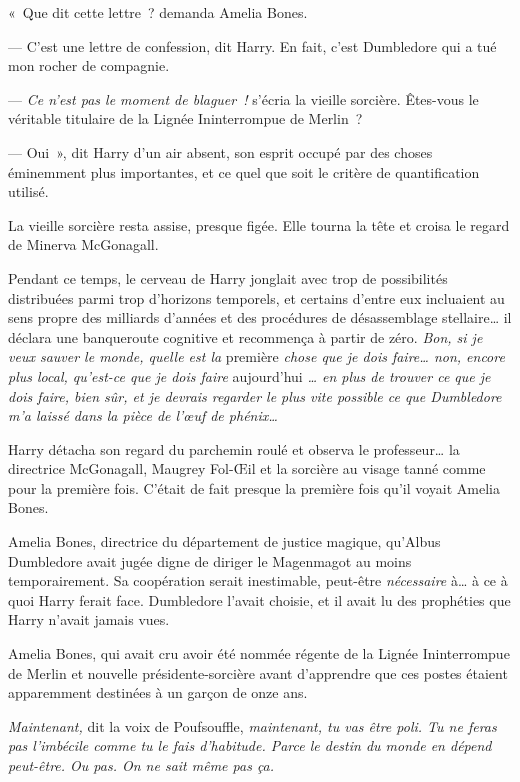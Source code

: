 «~Que dit cette lettre~? demanda Amelia Bones.

--- C'est une lettre de confession, dit Harry. En fait, c'est Dumbledore qui a tué mon rocher de compagnie.

--- \emph{Ce n'est pas le moment de blaguer~!} s'écria la vieille sorcière. Êtes-vous le véritable titulaire de la Lignée Ininterrompue de Merlin~?

--- Oui~», dit Harry d'un air absent, son esprit occupé par des choses éminemment plus importantes, et ce quel que soit le critère de quantification utilisé.

La vieille sorcière resta assise, presque figée. Elle tourna la tête et croisa le regard de Minerva McGonagall.

Pendant ce temps, le cerveau de Harry jonglait avec trop de possibilités distribuées parmi trop d'horizons temporels, et certains d'entre eux incluaient au sens propre des milliards d'années et des procédures de désassemblage stellaire… il déclara une banqueroute cognitive et recommença à partir de zéro. \emph{Bon, si je veux sauver le monde, quelle est la} première \emph{chose que je dois faire… non, encore plus local, qu'est-ce que je dois faire} aujourd'hui \emph{… en plus de trouver ce que je dois faire, bien sûr, et je devrais regarder le plus vite possible ce que Dumbledore m'a laissé dans la pièce de l'œuf de phénix…}

Harry détacha son regard du parchemin roulé et observa le professeur… la directrice McGonagall, Maugrey Fol-Œil et la sorcière au visage tanné comme pour la première fois. C'était de fait presque la première fois qu'il voyait Amelia Bones.

Amelia Bones, directrice du département de justice magique, qu'Albus Dumbledore avait jugée digne de diriger le Magenmagot au moins temporairement. Sa coopération serait inestimable, peut-être \emph{nécessaire} à… à ce à quoi Harry ferait face. Dumbledore l'avait choisie, et il avait lu des prophéties que Harry n'avait jamais vues.

Amelia Bones, qui avait cru avoir été nommée régente de la Lignée Ininterrompue de Merlin et nouvelle présidente-sorcière avant d'apprendre que ces postes étaient apparemment destinées à un garçon de onze ans.

\emph{Maintenant,} dit la voix de Poufsouffle, \emph{maintenant, tu vas être poli. Tu ne feras pas l'imbécile comme tu le fais d'habitude. Parce le destin du monde en dépend peut-être. Ou pas. On ne sait même pas ça.}

